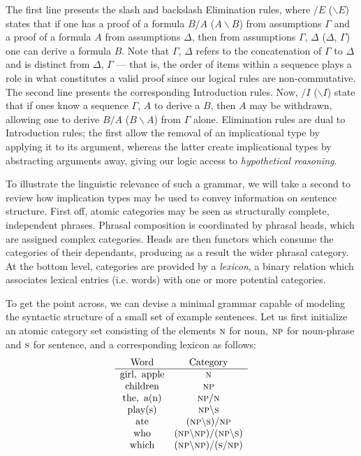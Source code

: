 The first line presents the slash and backslash Elimination rules, where $/E$ ($\backslash E$) states that if one has a proof of a formula $B/A$ ($A \backslash B$) from assumptions $\Gamma$ and a proof of a formula $A$ from assumptions $\Delta$, then from assumptions $\Gamma$, $\Delta$ ($\Delta$, $\Gamma$) one can derive a formula $B$.
Note that $\Gamma$, $\Delta$ refers to the concatenation of $\Gamma$ to $\Delta$ and is distinct from $\Delta$, $\Gamma$  --- that is, the order of items within a sequence plays a role in what constitutes a valid proof since our logical rules are non-commutative.
The second line presents the corresponding Introduction rules.
Now, $/I$ ($\backslash I$) state that if ones know a sequence $\Gamma$, $A$ to derive a $B$, then $A$ may be withdrawn, allowing one to derive $B/A$ ($B \backslash A$) from $\Gamma$ alone.
Elimination rules are dual to Introduction rules; the first allow the removal of an implicational type by applying it to its argument, whereas the latter create implicational types by abstracting arguments away, giving our logic access to \textit{hypothetical reasoning}.

To illustrate the linguistic relevance of such a grammar, we will take a second  to review how implication types may be used to convey information on sentence structure.
First off, atomic categories may be seen as structurally complete, independent phrases.
Phrasal composition is coordinated by phrasal heads, which are assigned complex categories.
Heads are then functors which consume the categories of their dependants, producing as a result the wider phrasal category.
At the bottom level, categories are provided by a \textit{lexicon}, a binary relation which associates lexical entries (i.e. words) with one or more potential categories.

To get the point across, we can devise a minimal grammar capable of modeling the syntactic structure of a small set of example sentences.
 Let us first initialize an atomic category set consisting of the elements $\textsc{n}$ for noun, $\textsc{np}$ for noun-phrase and $\textsc{s}$ for sentence, and a corresponding lexicon as follows:
 \[
 \begin{array}{cc}
 \text{Word} & \text{Category} \\
 \hline
 \text{girl}, \ \text{apple} & \textsc{n} \\
 \text{children} & \textsc{np} \\
 \text{the}, \ \text{a(n)} & \textsc{np}/ \textsc{n} \\
 \text{play(s)} & \textsc{np}\backslash \textsc{s} \\
 \text{ate} & (\textsc{np} \backslash \textsc{s}) / \textsc{np} \\ 
 \text{who} & (\textsc{np} \backslash \textsc{np}) / (\textsc{np} \backslash \textsc{s}) \\
 \text{which} & (\textsc{np} \backslash \textsc{np})/(\textsc{s} / \textsc{np})
 \end{array}
 \]

